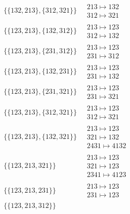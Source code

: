 \begin{scriptsize}
\begin{align}
\begin{matrix}
\end{matrix}
\\
\{\{132, 213\}, \{312, 321\}\}
\ 
&
\begin{matrix}
213 \mapsto 132\\312 \mapsto 321
\end{matrix}
\\
\{\{123, 213\}, \{132, 312\}\}
\ 
&
\begin{matrix}
213 \mapsto 123\\312 \mapsto 132
\end{matrix}
\\
\{\{123, 213\}, \{231, 312\}\}
\ 
&
\begin{matrix}
213 \mapsto 123\\231 \mapsto 312
\end{matrix}
\\
\{\{123, 213\}, \{132, 231\}\}
\ 
&
\begin{matrix}
213 \mapsto 123\\231 \mapsto 132
\end{matrix}
\\
\{\{123, 213\}, \{231, 321\}\}
\ 
&
\begin{matrix}
213 \mapsto 123\\231 \mapsto 321
\end{matrix}
\\
\{\{123, 213\}, \{312, 321\}\}
\ 
&
\begin{matrix}
213 \mapsto 123\\312 \mapsto 321
\end{matrix}
\\
\{\{123, 213\}, \{132, 321\}\}
\ 
&
\begin{matrix}
213 \mapsto 123\\321 \mapsto 132\\2431 \mapsto 4132
\end{matrix}
\\
\{\{123, 213, 321\}\}
\ 
&
\begin{matrix}
213 \mapsto 123\\321 \mapsto 123\\2341 \mapsto 4123
\end{matrix}
\\
\{\{123, 213, 231\}\}
\ 
&
\begin{matrix}
213 \mapsto 123\\231 \mapsto 123
\end{matrix}
\\
\{\{123, 213, 312\}\}
\ 
&
\begin{matrix}

\end{matrix}
\end{align}
\end{scriptsize}
